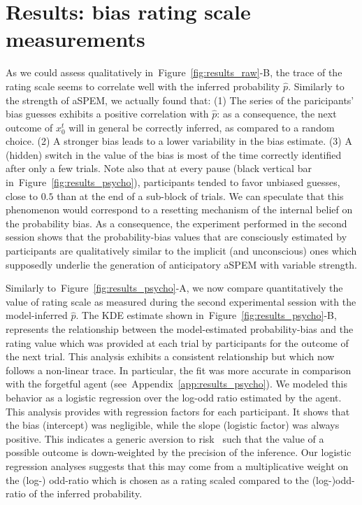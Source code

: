\documentclass[12pt,english]{article}%
\newcommand{\citep}[1]{\parencite{#1}}
\newcommand{\seeFig}[1]{Figure~\ref{fig:#1}}
\newcommand{\seeApp}[1]{Appendix~\ref{app:#1}}
\newcommand{\AM}[1]{\textbf{\textcolor{blue}{[AM: #1]}}}
\begin{document}
\section{Results: bias rating scale measurements}
\label{sec:rating_scale}
As we could assess qualitatively in~\seeFig{results_raw}-B,
the trace of the rating scale seems to correlate well
with the inferred probability $\hat{p}$.
Similarly to the strength of aSPEM, we actually found that:
(1) The series of the paricipants' bias guesses exhibits a positive correlation with $\hat{p}$:
as a consequence, the next outcome of $x_{0}^{t}$ will in general be correctly inferred,
as compared to a random choice. %
(2) A stronger bias leads to a lower variability in the bias estimate.
(3) A (hidden) switch in the value of the bias is
most of the time correctly identified after only a few trials.
Note also that at every pause (black vertical bar in~\seeFig{results_psycho}),
participants tended to favor unbiased guesses, close to $0.5$
than at the end of a sub-block of trials.
We can speculate that this phenomenon would correspond to a resetting mechanism of the internal belief on the probability bias.
As a consequence, the experiment performed in the second session
shows that the probability-bias values that are consciously estimated by participants
are qualitatively similar to the implicit (and unconscious) ones which supposedly underlie the generation of anticipatory aSPEM with variable strength.

Similarly to~\seeFig{results_psycho}-A,
we now compare quantitatively the value of rating scale
as measured during the second experimental session with the model-inferred $\hat{p}$.
The KDE estimate shown in~\seeFig{results_psycho}-B,
represents the relationship between
the model-estimated probability-bias
and the rating value which was provided at each trial
by participants for the outcome of the next trial.
This analysis exhibits a consistent relationship
but which now follows a non-linear trace.
In particular, the fit was more accurate
in comparison with
the forgetful agent (see~\seeApp{results_psycho}).
We modeled this behavior as
a logistic regression over
the log-odd ratio estimated by the agent.
This analysis provides with regression factors for each participant.
It shows that the bias (intercept)
was negligible, while the slope (logistic factor)
was always positive.
This indicates a generic aversion to risk~\citep{Kahneman13}
such that the value of a possible outcome
is down-weighted by the precision of the inference.
Our logistic regression analyses
suggests that this may come from a multiplicative weight
on the (log-) odd-ratio which is chosen as a rating scaled
compared to the (log-)odd-ratio of the inferred probability. %
\end{document}
